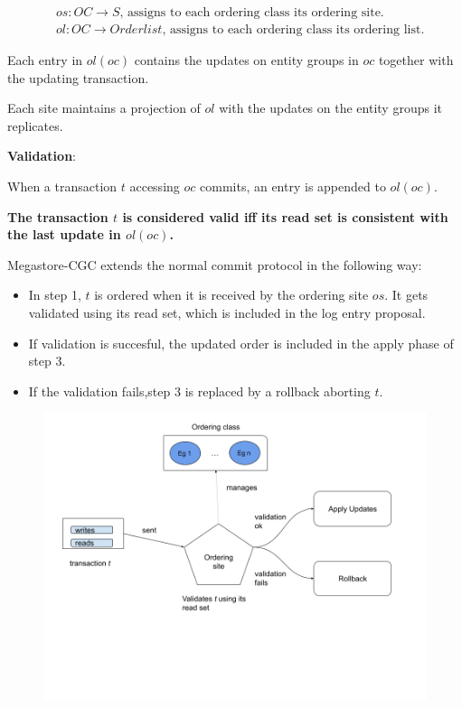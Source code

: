 \documentclass{beamer}
\begin{document}
\begin{frame}
    \small
    \begin{align*}
   &os: OC \rightarrow S\text{, assigns to each ordering class its ordering site.}\\
   &ol:OC \rightarrow Orderlist\text{, assigns to each ordering class its ordering list.}
    \end{align*}

    Each entry in $ol(oc)$ contains the updates on entity groups in $oc$ together with the updating transaction.

    \medskip
    Each site maintains a projection of $ol$ with the updates on the entity groups it replicates.

    \bigskip
    \textbf{Validation}:

    \medskip
    When a transaction $t$ accessing $oc$ commits, an entry is appended to $ol(oc)$. 

    \bigskip
    \textbf{The transaction $t$ is considered valid iff its read set is consistent with the last update in $ol(oc)$.} 
\end{frame}
\begin{frame}
    \small
    Megastore-CGC extends the normal commit protocol in the following way:
    \begin{itemize}
        \item In step 1, $t$ is ordered when it is received by the ordering site $os$.
        It gets validated using its read set, which is included in the log entry proposal.

        \item If validation is succesful, the updated order is included in the apply phase of step 3.
        \item If the validation fails,step 3 is replaced by a rollback aborting $t$.
    \end{itemize}
    \begin{figure}
        \includegraphics[width=\textwidth,height=.7\textheight,keepaspectratio]{img/validate.png}
    \end{figure}
\end{frame}
\end{document}
